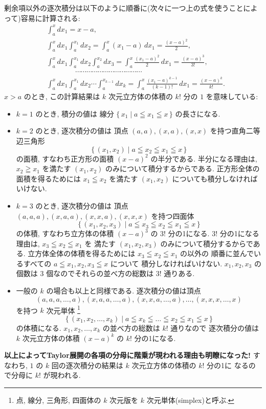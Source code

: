 \documentclass[12pt,twoside]{jarticle}
\theoremstyle{jplain}
\theoremstyle{jplain}
\theoremstyle{jplain}
\numberwithin{theorem}{section}
\numberwithin{equation}{section}
\numberwithin{figure}{section}
\numberwithin{table}{section}
\begin{document}
剰余項以外の逐次積分は以下のように順番に(次々に一つ上の式を使うことによって)容易に計算される:
\begin{align*}
&
\int_a^x\!\!\!dx_1 = x-a,
\\ &
\int_a^x\!\!\!dx_1\int_a^{x_1}\!\!\!dx_2
=\int_a^x (x_1-a)\,dx_1
=\frac{(x-a)^2}{2},
\\ &
\int_a^x\!\!\!dx_1\int_a^{x_1}\!\!\!dx_2\int_a^{x_2}\!\!\!dx_3
=\int_a^x\frac{(x_1-a)^2}{2}\,dx_1
=\frac{(x-a)^3}{3!},
\\ &
\qquad\qquad\cdots\cdots\cdots\cdots\cdots\cdots\cdots\cdots\cdots\cdots\cdots\cdots
\\ &
\int_a^x\!\!\!dx_1\int_a^{x_1}\!\!\!dx_2\cdots\!\!\int_a^{x_{k-1}}\!\!\!dx_k
=\int_a^x\frac{(x_1-a)^{k-1}}{(k-1)!}\,dx_1
=\frac{(x-a)^k}{k!}.
\end{align*}
$x>a$ のとき, この計算結果は $k$ 次元立方体の体積の $k!$ 分の $1$ を意味している:
\begin{itemize}
\item $k=1$ のとき, 積分の値は
線分 $\{\, x_1 \mid a\leqq x_1\leqq x\,\}$ の長さになる.

\item $k=2$ のとき, 逐次積分の値は
頂点 $(a,a),(x,a),(x,x)$ を持つ直角二等辺三角形 
\[
\{\,(x_1,x_2)\mid a\leqq x_2\leqq x_1\leqq x\,\}
\]
の面積, すなわち正方形の面積 $(x-a)^2$ の半分である.
半分になる理由は, $x_2\geqq x_1$ を満たす $(x_1,x_2)$ 
のみについて積分するからである. 正方形全体の面積を得るためには
$x_1\leqq x_2$ を満たす $(x_1,x_2)$ についても積分しなければいけない.

\item $k=3$ のとき, 逐次積分の値は
頂点 $(a,a,a),(x,a,a),(x,x,a),(x,x,x)$ を持つ四面体
\[
\{\,(x_1,x_2,x_3)\mid a\leqq x_3\leqq x_2\leqq x_1\leqq x\,\}
\]
の体積, すなわち立方体の体積 $(x-a)^3$ の $3!$ 分の1になる.
$3!$ 分の1になる理由は, $x_3\leqq x_2\leqq x_1$ を
満たす $(x_1,x_2,x_3)$ のみについて積分するからである.
立方体全体の体積を得るためには $x_3\leqq x_2\leqq x_1$ の以外の
順番に並んでいるすべての $a\leqq x_1,x_2,x_3\leqq x$ について
積分しなければいけない.  
$x_1,x_2,x_3$ の個数は $3$ 個なのでそれらの並べ方の総数は $3!$ 通りある.

\item 一般の $k$ の場合も以上と同様である.
逐次積分の値は頂点 
\[
(a,a,a,\ldots,a),(x,a,a,\ldots,a),(x,x,a,\ldots,a),\ldots,(x,x,x,\ldots,x)
\]
を持つ $k$ 次元単体%
\footnote{点, 線分, 三角形, 四面体の $k$ 次元版を $k$ 次元単体(simplex)と呼ぶ.}
\[
\{\,(x_1,x_2,\ldots,x_k)\mid a\leqq x_k\leqq\ldots\leqq x_2\leqq x_1\leqq x\,\}
\]
の体積になる.
$x_1,x_2,\ldots,x_k$ の並べ方の総数は $k!$ 通りなので
逐次積分の値は $k$ 次元立方体の体積 $(x-a)^k$ の $k!$ 分の1になる.
\end{itemize}
{\bf 以上によってTaylor展開の各項の分母に階乗が現われる理由も明瞭になった!}
すなわち, $1$ の $k$ 回の逐次積分の結果は $k$ 次元立方体の体積の $k!$ 分の1に
なるので分母に $k!$ が現われる.
\end{document}

